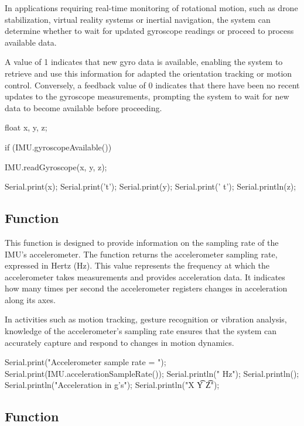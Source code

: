 In applications requiring real-time monitoring of rotational motion, such as drone stabilization, virtual reality systems or inertial navigation, the system can determine whether to wait for updated gyroscope readings or proceed to process available data. \cite{Arduino_IMU_Gyroscope:2024}

A value of 1 indicates that new gyro data is available, enabling the system to retrieve and use this information for adapted the orientation tracking or motion control. Conversely, a feedback value of 0 indicates that there have been no recent updates to the gyroscope measurements, prompting the system to wait for new data to become available before proceeding.

\begin{Arduino}
	float x, y, z;
	
	if (IMU.gyroscopeAvailable()) {
		IMU.readGyroscope(x, y, z);
		
		Serial.print(x);
		Serial.print('t');
		Serial.print(y);
		Serial.print(' t');
		Serial.println(z); }
\end{Arduino}


\subsection{Function }

This function is designed to provide information on the sampling rate of the IMU's accelerometer. The function  returns the accelerometer sampling rate, expressed in Hertz (Hz). This value represents the frequency at which the accelerometer takes measurements and provides acceleration data. It indicates how many times per second the accelerometer registers changes in acceleration along its axes. \cite{STMicroelectronics_LSM9DS1:2024}

In activities such as motion tracking, gesture recognition or vibration analysis, knowledge of the accelerometer's sampling rate ensures that the system can accurately capture and respond to changes in motion dynamics. 

\begin{Arduino}
	Serial.print("Accelerometer sample rate = ");
	Serial.print(IMU.accelerationSampleRate());
	Serial.println(" Hz");
	Serial.println();
	Serial.println("Acceleration in g's");
	Serial.println("X \t Y  \t Z");
\end{Arduino}



\subsection{Function }

